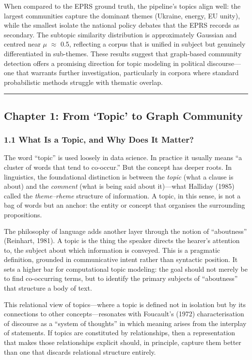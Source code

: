 \documentclass[11pt]{article}
\begin{document}
When compared to the EPRS ground truth, the pipeline's topics align well: the largest communities capture the dominant themes (Ukraine, energy, EU unity), while the smallest isolate the national policy debates that the EPRS records as secondary. The subtopic similarity distribution is approximately Gaussian and centred near $\mu$ $\approx$ 0.5, reflecting a corpus that is unified in subject but genuinely differentiated in sub-themes. These results suggest that graph-based community detection offers a promising direction for topic modeling in political discourse---one that warrants further investigation, particularly in corpora where standard probabilistic methods struggle with thematic overlap.


\hrule


\subsection{Chapter 1: From `Topic' to Graph Community}


\subsubsection{1.1 What Is a Topic, and Why Does It Matter?}


The word ``topic'' is used loosely in data science. In practice it usually means ``a cluster of words that tend to co-occur.'' But the concept has deeper roots. In linguistics, the foundational distinction is between the \emph{topic} (what a clause is about) and the \emph{comment} (what is being said about it)---what Halliday (1985) called the \emph{theme--rheme} structure of information. A topic, in this sense, is not a bag of words but an anchor: the entity or concept that organises the surrounding propositions.

The philosophy of language adds another layer through the notion of ``aboutness'' (Reinhart, 1981). A topic is the thing the speaker directs the hearer's attention to, the subject about which information is conveyed. This is a pragmatic definition, grounded in communicative intent rather than syntactic position. It sets a higher bar for computational topic modeling: the goal should not merely be to find co-occurring terms, but to identify the primary subjects of ``aboutness'' that structure a body of text.

This relational view of topics---where a topic is defined not in isolation but by its connections to other concepts---resonates with Foucault's (1972) characterisation of discourse as a ``system of thoughts'' in which meaning arises from the interplay of statements. If topics are constituted by relationships, then a representation that makes those relationships explicit should, in principle, capture them better than one that discards relational structure entirely.
\end{document}
